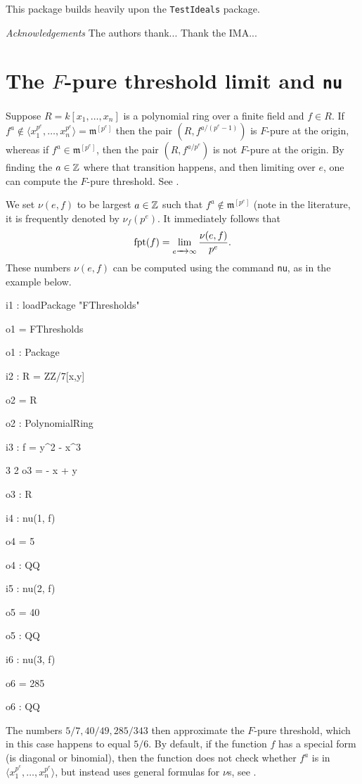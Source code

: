 \documentclass{amsart}
\newcommand{\fram}{\mathfrak{m}}
\begin{document}
This package builds heavily upon the {\tt TestIdeals} package.  

{\it Acknowledgements}  The authors thank...  Thank the IMA...

\section{The $F$-pure threshold limit and {\tt nu}}
\label{sec.Nu}

Suppose $R = k[x_1, \dots, x_n]$ is a polynomial ring over a finite field and $f \in R$.    If $f^a \notin \langle x_1^{p^e}, \dots, x_n^{p^e} \rangle = \fram^{[p^e]}$ then the pair $(R, f^{a/(p^e -1)})$ is $F$-pure at the origin, whereas if $f^a \in \fram^{[p^e]}$, then the pair $(R, f^{a/p^e})$ is not $F$-pure at the origin.  By finding the $a \in \mathbb{Z}$ where that transition happens, and then limiting over $e$, one can compute the $F$-pure threshold.  See \cite{MustataTakagiWatanabeFThresholdsAndBernsteinSato}.

We set $\nu(e, f)$ to be largest $a \in \mathbb{Z}$ such that $f^a \notin \fram^{[p^e]}$ (note in the literature, it is frequently denoted by $\nu_f(p^e)$.  It immediately follows that 
\[
\operatorname{{fpt}}(f) = \lim_{e \xrightarrow{\ \ } \infty} {\nu(e, f) \over p^e}.
\]
These numbers $\nu(e, f)$ can be computed using the command {\tt nu}, as in the example below.  
\medskip
{\small
{}
\begin{MyVerbatim}
i1 : loadPackage "FThresholds"

o1 = FThresholds

o1 : Package

i2 : R = ZZ/7[x,y]

o2 = R

o2 : PolynomialRing

i3 : f = y^2 - x^3

        3    2
o3 = - x  + y

o3 : R

i4 : nu(1, f)

o4 = 5

o4 : QQ

i5 : nu(2, f)

o5 = 40

o5 : QQ

i6 : nu(3, f)

o6 = 285

o6 : QQ
\end{MyVerbatim}
}
\medskip
The numbers $5/7, 40/49, 285/343$ then approximate the $F$-pure threshold, which in this case happens to equal $5/6$.  By default, if the function $f$ has a special form (is diagonal or binomial), then the function does not check whether $f^a$ is in  $\langle x_1^{p^e}, \dots, x_n^{p^e} \rangle$, but instead uses general formulas for $\nu$s, see \cite{HernandezFPureThresholdOfBinomial,HernandezFInvariantsOfDiagonalHyp}.
\end{document}
